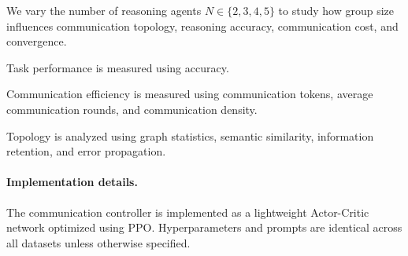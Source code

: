 \documentclass[11pt]{article}
\newcommand{\sys}{\textsc{SparseComm}\xspace}
\newcommand{\ctrl}{\textsc{IB-Controller}\xspace}
\newcommand{\todo}[1]{\textcolor{red}{\textbf{[#1]}}}
\begin{document}
We vary the number of reasoning agents
$N\in\{2,3,4,5\}$
to study how group size influences communication topology,
reasoning accuracy,
communication cost,
and convergence.

Task performance is measured using accuracy.

Communication efficiency is measured using communication tokens, average communication rounds, and communication density.

Topology is analyzed using graph statistics, semantic similarity, information retention, and error propagation.

\paragraph{Implementation details.}

The communication controller is implemented as a lightweight Actor-Critic
network optimized using PPO.
Hyperparameters and prompts are identical across all datasets unless otherwise
specified.
%
%
%
%
\end{document}
